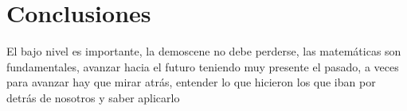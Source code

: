 
\chapter{Conclusiones}

El bajo nivel es importante, la demoscene no debe perderse, las matemáticas son fundamentales, avanzar hacia el futuro teniendo muy presente el pasado, a veces para avanzar hay que mirar atrás, entender lo que hicieron los que iban por detrás de nosotros y saber aplicarlo